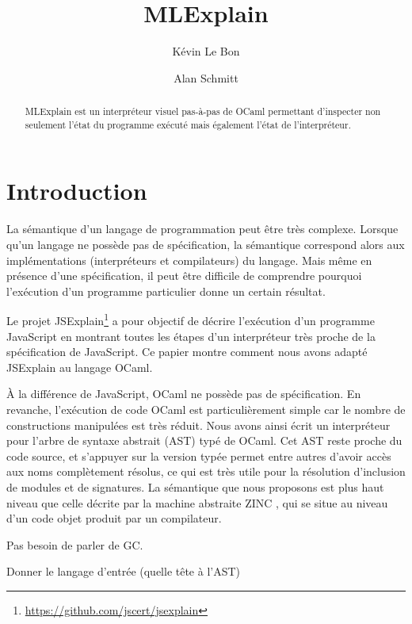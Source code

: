 \documentclass{easychair}
\title{MLExplain}
\author{
  Kévin Le Bon\inst{1}
  \and
  Alan Schmitt\inst{1}
}
\institute{
  Inria
 }
\begin{document}
\maketitle

\begin{abstract}
MLExplain est un interpréteur visuel pas-à-pas de OCaml permettant
d'inspecter non seulement l'état du programme exécuté mais également
l'état de l'interpréteur.
\end{abstract}

\section{Introduction}

La sémantique d'un langage de programmation peut être très complexe. Lorsque
qu'un langage ne possède pas de spécification, la sémantique correspond alors
aux implémentations (interpréteurs et compilateurs) du langage. Mais même en
présence d'une spécification, il peut être difficile de comprendre pourquoi
l'exécution d'un programme particulier donne un certain résultat.

Le projet JSExplain\footnote{\url{https://github.com/jscert/jsexplain}} a pour
objectif de décrire l'exécution d'un programme JavaScript en montrant toutes les
étapes d'un interpréteur très proche de la spécification de JavaScript. Ce
papier montre comment nous avons adapté JSExplain au langage OCaml.

À la différence de JavaScript, OCaml ne possède pas de spécification. En
revanche, l'exécution de code OCaml est particulièrement simple car le nombre de
constructions manipulées est très réduit. Nous avons ainsi écrit un interpréteur
pour l'arbre de syntaxe abstrait (AST) typé de OCaml. Cet AST reste proche du
code source, et s'appuyer sur la version typée permet entre autres d'avoir accès
aux noms complètement résolus, ce qui est très utile pour la résolution
d'inclusion de modules et de signatures. La sémantique que nous proposons est
plus haut niveau que celle décrite par la machine abstraite ZINC
\cite{Leroy-ZINC}, qui se situe au niveau d'un code objet produit par un
compilateur. 

Pas besoin de parler de GC.

Donner le langage d'entrée (quelle tête à l'AST)
\end{document}
